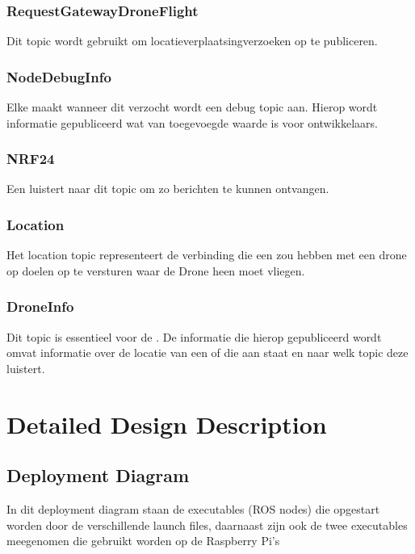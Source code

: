 \documentclass[a4paper, 11pt, oneside]{report}
\begin{document}
\subsection{RequestGatewayDroneFlight}
\label{architectural:ros:topic:RequestGatewayDroneFlight}
Dit topic wordt gebruikt om locatieverplaatsingverzoeken op te publiceren. 

\subsection{NodeDebugInfo}
\label{architectural:ros:topic:NodeDebugInfo}
Elke  maakt wanneer dit verzocht wordt een debug topic aan. Hierop wordt informatie gepubliceerd wat van toegevoegde waarde is voor ontwikkelaars.

\subsection{NRF24}
\label{architectural:ros:topic:NRF24}
Een  luistert naar dit topic om zo berichten te kunnen ontvangen.

\subsection{Location}
\label{architectural:ros:topic:Location}
Het location topic representeert de verbinding die een  zou hebben met een drone op doelen op te versturen waar de Drone heen moet vliegen. 

\subsection{DroneInfo}
\label{architectural:ros:topic:DroneInfo}
Dit topic is essentieel voor de . De informatie die hierop gepubliceerd wordt omvat informatie over de locatie van een  of die aan staat en naar welk  topic deze luistert.

\chapter{Detailed Design Description}
\label{DetailedDesign}

\section{Deployment Diagram}
\label{DetailedDesign:deployment}
In dit deployment diagram staan de executables (ROS nodes) die opgestart worden door de verschillende launch files, daarnaast zijn ook de twee executables meegenomen die gebruikt worden op de Raspberry Pi's
\end{document}

